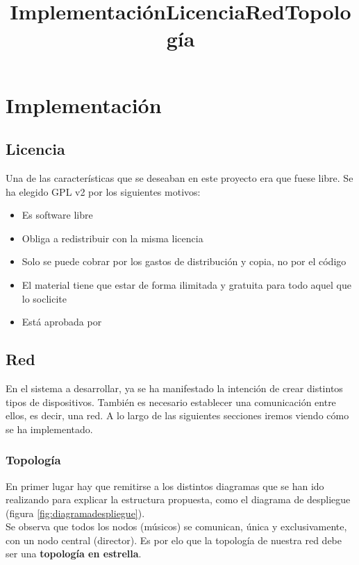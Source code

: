 \chapter{Implementación}
\title{Implementación}
\label{cap:Implementacion}

\section{Licencia}
\title{Licencia}

Una de las características que se deseaban en este proyecto era que fuese libre.
Se ha elegido GPL v2 por los siguientes motivos:
\begin{itemize}
  \item Es software libre
  \item Obliga a redistribuir con la misma licencia
  \item Solo se puede cobrar por los gastos de distribución y copia, no por el código
  \item El material tiene que estar de forma ilimitada y gratuita para todo aquel que lo soclicite
  \item Está aprobada por 
\end{itemize}


\section{Red}
\title{Red}

En el sistema a desarrollar, ya se ha manifestado la intención de crear distintos
tipos de dispositivos. También es necesario establecer una comunicación entre ellos,
es decir, una red. A lo largo de las siguientes secciones iremos viendo cómo se
ha implementado.\\

\subsection{Topología}
\title{Topología}
En primer lugar hay que remitirse a los distintos diagramas que se han ido
realizando para explicar la estructura propuesta, como el diagrama de despliegue (figura \ref{fig:diagramadespliegue}).\\

Se observa que todos los nodos (músicos) se comunican, única y exclusivamente, con un nodo central (director).
Es por elo que la topología de nuestra red debe ser una \textbf{topología en estrella}.\\

